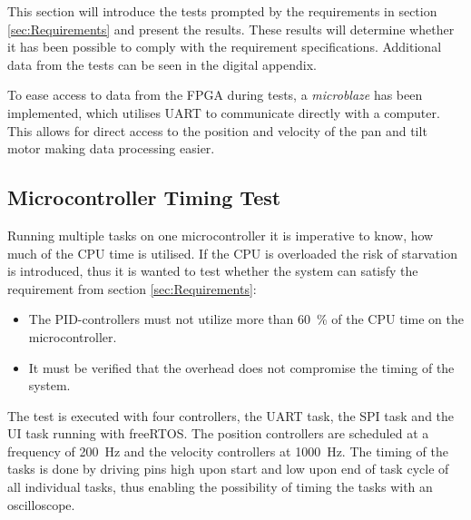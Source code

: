 \documentclass[../../main.tex]{subfiles}
\begin{document}
This section will introduce the tests prompted by the requirements in section \ref{sec:Requirements} and present the results. These results will determine whether it has been possible to comply with the requirement specifications. Additional data from the tests can be seen in the digital appendix. 

To ease access to data from the FPGA during tests, a \textit{microblaze} has been implemented, which utilises UART to communicate directly with a computer. This allows for direct access to the position and velocity of the pan and tilt motor making data processing easier. 

\subsection{Microcontroller Timing Test}
Running multiple tasks on one microcontroller it is imperative to know, how much of the CPU time is utilised. If the CPU is overloaded the risk of starvation is introduced, thus it is wanted to test whether the system can satisfy the requirement from section \ref{sec:Requirements}: 
\begin{itemize}
    \item The PID-controllers must not utilize more than \SI{60}{\percent} of the CPU time on the microcontroller.
    \item It must be verified that the overhead does not compromise the timing of the system.
\end{itemize}

The test is executed with four controllers, the UART task, the SPI task and the UI task running with freeRTOS. The position controllers are scheduled at a frequency of \SI{200}{\hertz} and the velocity controllers at \SI{1000}{\hertz}. The timing of the tasks is done by driving pins high upon start and low upon end of task cycle of all individual tasks, thus enabling the possibility of timing the tasks with an oscilloscope.
\end{document}

